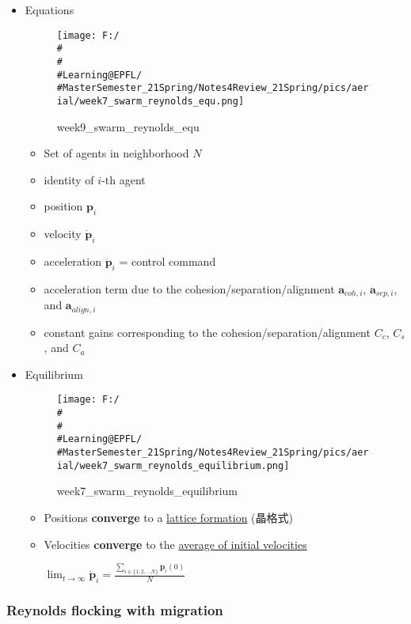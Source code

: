 \documentclass[]{article}
\begin{document}
\begin{itemize}
\item
  Equations

  \begin{figure}
  \centering
  \texttt{[image: F:/\\\#\\\#\\\#Learning@EPFL/\\\#MasterSemester\_21Spring/Notes4Review\_21Spring/pics/aerial/week7\_swarm\_reynolds\_equ.png]}
  \caption{week9\_swarm\_reynolds\_equ}
  \end{figure}

  \begin{itemize}
  \item
    Set of agents in neighborhood \(N\)
  \item
    identity of \(i\)-th agent
  \item
    position \({\mathbf{p}_i}\)
  \item
    velocity \(\dot{\mathbf{p}}_i\)
  \item
    acceleration \(\ddot{\mathbf{p}}_i\) = control command
  \item
    acceleration term due to the cohesion/separation/alignment
    \(\mathbf{a}_{coh,i}\), \(\mathbf{a}_{sep,i}\), and
    \(\mathbf{a}_{align,i}\)
  \item
    constant gains corresponding to the cohesion/separation/alignment
    \(C_c\), \(C_s\), and \(C_a\)
  \end{itemize}
\item
  Equilibrium

  \begin{figure}
  \centering
  \texttt{[image: F:/\\\#\\\#\\\#Learning@EPFL/\\\#MasterSemester\_21Spring/Notes4Review\_21Spring/pics/aerial/week7\_swarm\_reynolds\_equilibrium.png]}
  \caption{week7\_swarm\_reynolds\_equilibrium}
  \end{figure}

  \begin{itemize}
  \item
    Positions \textbf{converge} to a \underline{lattice formation}
    (晶格式)
  \item
    Velocities \textbf{converge} to the \underline{average of initial
    velocities}

    \(\lim _{t \rightarrow \infty} \dot{\boldsymbol{p}}_{i}=\frac{\sum_{i \in\{1,2, \ldots N\}} \dot{\boldsymbol{p}}_{i}(0)}{N}\)
  \end{itemize}
\end{itemize}

\subsubsection{Reynolds flocking with migration}\label{header-n1298}
\end{document}
